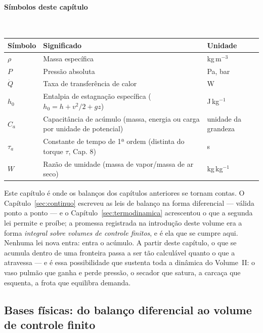 \documentclass[12pt,a4paper]{article}
\numberwithin{equation}{section}
\numberwithin{table}{section}
\numberwithin{figure}{section}
\begin{document}
\paragraph{Símbolos deste capítulo}\mbox{}\\[-0.5em]
{\small
\begin{longtable}{>{\raggedright\arraybackslash}p{2.6cm} >{\raggedright\arraybackslash}p{9.2cm} >{\raggedright\arraybackslash}p{2.6cm}}
	\toprule
	\textbf{Símbolo} & \textbf{Significado} & \textbf{Unidade} \\ \midrule
	\endhead
	$\rho$ & Massa específica & kg\,m$^{-3}$ \\
	$P$ & Pressão absoluta & Pa, bar \\
	$\dot{Q}$ & Taxa de transferência de calor & W \\
	$h_0$ & Entalpia de estagnação específica ($h_0 = h + v^2/2 + gz$) & J\,kg$^{-1}$ \\
	$C_a$ & Capacitância de acúmulo (massa, energia ou carga por unidade de potencial) & unidade da grandeza \\
	$\tau_a$ & Constante de tempo de 1ª ordem (distinta do torque $\tau$, Cap. 8) & s \\
	$W$ & Razão de umidade (massa de vapor/massa de ar seco) & kg\,kg$^{-1}$ \\
	\bottomrule
\end{longtable}
}




Este capítulo é onde os balanços dos capítulos anteriores se tornam contas.
O Capítulo~\ref{sec:continuo} escreveu as leis de balanço na forma diferencial
--- válida ponto a ponto --- e o Capítulo~\ref{sec:termodinamica} acrescentou
o que a segunda lei permite e proíbe; a promessa registrada na introdução
deste volume era a forma \emph{integral sobre volumes de controle finitos}, e
é ela que se cumpre aqui. Nenhuma lei nova entra: entra o acúmulo. A partir
deste capítulo, o que se acumula dentro de uma fronteira passa a ser tão
calculável quanto o que a atravessa --- e é essa possibilidade que sustenta
toda a dinâmica do Volume~II: o vaso pulmão que ganha e perde pressão, o
secador que satura, a carcaça que esquenta, a frota que equilibra demanda.

\subsection{Bases físicas: do balanço diferencial ao volume de controle
finito}\label{sub:v1-c6-bases}
\end{document}
